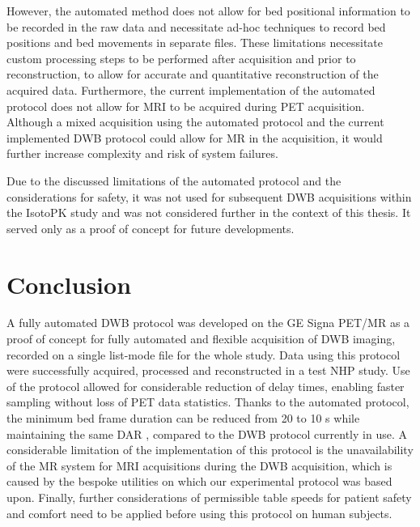 However, the automated method does not allow for bed positional information to be recorded in the raw data and necessitate ad-hoc techniques to record bed positions and bed movements in separate files. These limitations necessitate custom processing steps to be performed after acquisition and prior to reconstruction, to allow for accurate and quantitative reconstruction of the acquired data. 
Furthermore, the current implementation of the automated protocol does not allow for MRI to be acquired during PET acquisition. Although a mixed acquisition using the automated protocol and the current implemented DWB protocol could allow for MR in the acquisition, it would further increase complexity and risk of system failures.

Due to the discussed limitations of the automated protocol and the considerations for safety, it was not used for subsequent DWB acquisitions within the IsotoPK study and was not considered further in the context of this thesis. It served only as a proof of concept for future developments.

\section{Conclusion}
A fully automated DWB protocol was developed on the GE Signa PET/MR as a proof of concept for fully automated and flexible acquisition of DWB imaging, recorded on a single list-mode file for the whole study. 
Data using this protocol were successfully acquired, processed and reconstructed in a test NHP study.
Use of the protocol allowed for considerable reduction of delay times, enabling faster sampling without loss of PET data statistics.
Thanks to the automated protocol, the minimum bed frame duration can be reduced from 20 to 10 s while maintaining the same DAR , compared to the DWB protocol currently in use.
A considerable limitation of the implementation of this protocol is the unavailability of the MR system for MRI acquisitions during the DWB acquisition, which is caused by the bespoke utilities on which our experimental protocol was based upon.
Finally, further considerations of permissible table speeds for patient safety and comfort need to be applied before using this protocol on human subjects.


